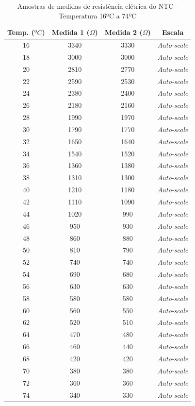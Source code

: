 \documentclass[a4paper]{instrumentacao}
\begin{document}
\begin{table}[H]
\centering
\caption{Amostras de medidas de resistência elétrica do NTC - Temperatura 16ºC a 74ºC}
\label{tab:amostras-ntc}
\begin{tabular}{|c|c|c|c|}
\hline
\textbf{Temp. ($ºC$)} & \textbf{Medida 1 ($\Omega$)} & \textbf{Medida 2 ($\Omega$)} & \textbf{Escala} \\ \hline
 16 & 3340 & 3330 & \textit{Auto-scale} \\ \hline
 18 & 3000 & 3000 & \textit{Auto-scale} \\ \hline
 20 & 2810 & 2770 & \textit{Auto-scale} \\ \hline
 22 & 2590 & 2530 & \textit{Auto-scale} \\ \hline
 24 & 2380 & 2400 & \textit{Auto-scale} \\ \hline
 26 & 2180 & 2160 & \textit{Auto-scale} \\ \hline
 28 & 1990 & 1970 & \textit{Auto-scale} \\ \hline
 30 & 1790 & 1770 & \textit{Auto-scale} \\ \hline
 32 & 1650 & 1640 & \textit{Auto-scale} \\ \hline
 34 & 1540 & 1520 & \textit{Auto-scale} \\ \hline
 36 & 1360 & 1380 & \textit{Auto-scale} \\ \hline
 38 & 1310 & 1300 & \textit{Auto-scale} \\ \hline
 40 & 1210 & 1180 & \textit{Auto-scale} \\ \hline
 42 & 1110 & 1090 & \textit{Auto-scale} \\ \hline
 44 & 1020 & 990 & \textit{Auto-scale} \\ \hline
 46 & 950 & 930 & \textit{Auto-scale} \\ \hline
 48 & 860 & 880 & \textit{Auto-scale} \\ \hline
 50 & 810 & 790 & \textit{Auto-scale} \\ \hline
 52 & 740 & 740 & \textit{Auto-scale} \\ \hline
 54 & 690 & 680 & \textit{Auto-scale} \\ \hline
 56 & 630 & 630 & \textit{Auto-scale} \\ \hline
 58 & 580 & 580 & \textit{Auto-scale} \\ \hline
 60 & 560 & 550 & \textit{Auto-scale} \\ \hline
 62 & 520 & 510 & \textit{Auto-scale} \\ \hline
 64 & 470 & 480 & \textit{Auto-scale} \\ \hline
 66 & 460 & 440 & \textit{Auto-scale} \\ \hline
 68 & 420 & 420 & \textit{Auto-scale} \\ \hline
 70 & 380 & 380 & \textit{Auto-scale} \\ \hline
 72 & 360 & 360 & \textit{Auto-scale} \\ \hline
 74 & 340 & 330 & \textit{Auto-scale} \\ \hline
\end{tabular}
\end{table}
\end{document}
